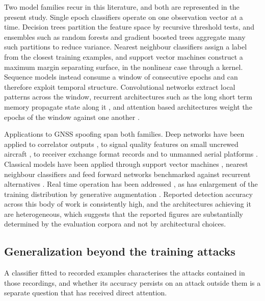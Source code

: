 \documentclass[pdflatex,sn-basic]{sn-jnl}
\theoremstyle{thmstyleone}
\theoremstyle{thmstyletwo}
\theoremstyle{thmstylethree}
\begin{document}
Two model families recur in this literature, and both are represented in the present
study. Single epoch classifiers operate on one observation vector at a time. Decision
trees partition the feature space by recursive threshold tests, and ensembles such as
random forests and gradient boosted trees aggregate many such partitions to reduce
variance. Nearest neighbour classifiers assign a label from the closest training examples,
and support vector machines construct a maximum margin separating surface, in the
nonlinear case through a kernel. Sequence models instead consume a window of consecutive
epochs and can therefore exploit temporal structure. Convolutional networks extract local
patterns across the window, recurrent architectures such as the long short term memory
propagate state along it \citep{hochreiter1997long}, and attention based architectures
weight the epochs of the window against one another \citep{vaswani2017attention}.

Applications to GNSS spoofing span both families. Deep networks have been applied to
correlator outputs \citep{borhanidarian2024deep}, to signal quality features on small
uncrewed aircraft \citep{sung2022cnn}, to receiver exchange format records
\citep{romaniuc2025lstm} and to unmanned aerial platforms \citep{yang2025deep}. Classical
models have been applied through support vector machines \citep{chen2022svm}, nearest
neighbour classifiers \citep{mahroof2024ml} and feed forward networks benchmarked against
recurrent alternatives \citep{jullian2022deep}. Real time operation has been addressed
\citep{li2025realtime}, as has enlargement of the training distribution by generative
augmentation \citep{chen2025cgan}. Reported detection accuracy across this body of work is
consistently high, and the architectures achieving it are heterogeneous, which suggests
that the reported figures are substantially determined by the evaluation corpora and
not by architectural choices.

\subsection{Generalization beyond the training attacks}
\label{sec:rw_generalization}

A classifier fitted to recorded examples characterises the attacks contained in those
recordings, and whether its accuracy persists on an attack outside them is a separate
question that has received direct attention.
\end{document}
